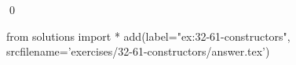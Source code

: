 
\begin{ex}
  \label{ex:32-61-constructors}
  
  \qed
\end{ex}
\begin{python0}
from solutions import *
add(label="ex:32-61-constructors",
    srcfilename='exercises/32-61-constructors/answer.tex')
\end{python0}
